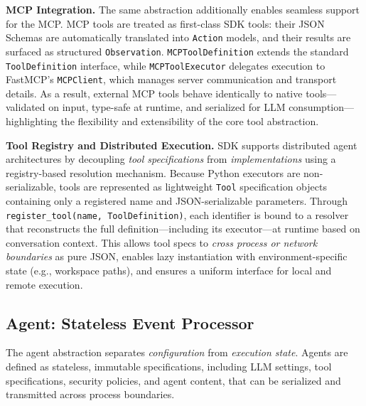 \textbf{MCP Integration.}
The same abstraction additionally enables seamless support for the MCP. MCP tools are treated as first-class SDK tools: their JSON Schemas are automatically translated into \texttt{Action} models, and their results are surfaced as structured \texttt{Observation}. 
% 
\texttt{MCPToolDefinition} extends the standard \texttt{ToolDefinition} interface, while \texttt{MCPToolExecutor} delegates execution to FastMCP’s \texttt{MCPClient}, which manages server communication and transport details. As a result, external MCP tools behave identically to native tools—validated on input, type-safe at runtime, and serialized for LLM consumption—highlighting the flexibility and extensibility of the core tool abstraction.

\textbf{Tool Registry and Distributed Execution.}
SDK supports distributed agent architectures by decoupling \emph{tool specifications} from \emph{implementations} using a registry-based resolution mechanism. Because Python executors are non-serializable, tools are represented as lightweight \texttt{Tool} specification objects containing only a registered name and JSON-serializable parameters. Through \texttt{register\_tool(name, ToolDefinition)}, each identifier is bound to a resolver that reconstructs the full definition—including its executor—at runtime based on conversation context. This allows tool specs to \textit{cross process or network boundaries} as pure JSON, enables lazy instantiation with environment-specific state (e.g., workspace paths), and ensures a uniform interface for local and remote execution.

\subsection{Agent: Stateless Event Processor}
\label{sec:agent}

The agent abstraction separates \emph{configuration} from \emph{execution state}. Agents are defined as stateless, immutable specifications, including LLM settings, tool specifications, security policies, and agent content, that can be serialized and transmitted across process boundaries.

